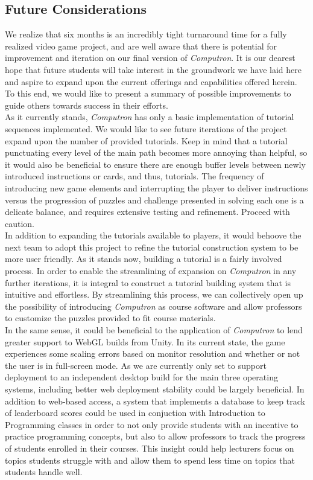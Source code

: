 \subsection{Future Considerations}
We realize that six months is an incredibly tight turnaround time for a fully realized video game project, and are well aware that there is potential for improvement and iteration on our final version of \textit{Computron}. It is our dearest hope that future students will take interest in the groundwork we have laid here and aspire to expand upon the current offerings and capabilities offered herein. To this end, we would like to present a summary of possible improvements to guide others towards success in their efforts.\\

As it currently stands, \textit{Computron} has only a basic implementation of tutorial sequences implemented. We would like to see future iterations of the project expand upon the number of provided tutorials. Keep in mind that a tutorial punctuating every level of the main path becomes more annoying than helpful, so it would also be beneficial to ensure there are enough buffer levels between newly introduced instructions or cards, and thus, tutorials. The frequency of introducing new game elements and interrupting the player to deliver instructions versus the progression of puzzles and challenge presented in solving each one is a delicate balance, and requires extensive testing and refinement. Proceed with caution.\\

In addition to expanding the tutorials available to players, it would behoove the next team to adopt this project to refine the tutorial construction system to be more user friendly. As it stands now, building a tutorial is a fairly involved process. In order to enable the streamlining of expansion on \textit{Computron} in any further iterations, it is integral to construct a tutorial building system that is intuitive and effortless. By streamlining this process, we can collectively open up the possibility of introducing \textit{Computron} as course software and allow professors to customize the puzzles provided to fit course materials.\\

In the same sense, it could be beneficial to the application of \textit{Computron} to lend greater support to WebGL builds from Unity. In its current state, the game experiences some scaling errors based on monitor resolution and whether or not the user is in full-screen mode. As we are currently only set to support deployment to an independent desktop build for the main three operating systems, including better web deployment stability could be largely beneficial. In addition to web-based access, a system that implements a database to keep track of leaderboard scores could be used in conjuction with Introduction to Programming classes in order to not only provide students with an incentive to practice programming concepts, but also to allow professors to track the progress of students enrolled in their courses. This insight could help lecturers focus on topics students struggle with and allow them to spend less time on topics that students handle well.\\

